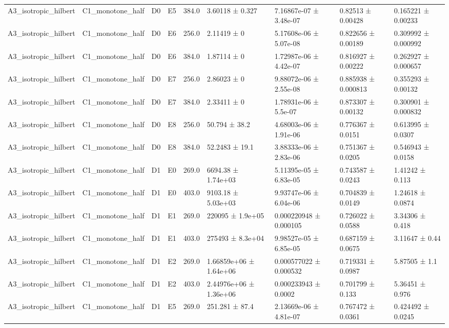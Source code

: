 \begin{table}
\begin{tabular}{lllllllll}
A3\_isotropic\_hilbert & C1\_monotone\_half & D0 & E5 & 384.0 & 3.60118 ± 0.327 & 7.16867e-07 ± 3.48e-07 & 0.82513 ± 0.00428 & 0.165221 ± 0.00233 \\
A3\_isotropic\_hilbert & C1\_monotone\_half & D0 & E6 & 256.0 & 2.11419 ± 0 & 5.17608e-06 ± 5.07e-08 & 0.822656 ± 0.00189 & 0.309992 ± 0.000992 \\
A3\_isotropic\_hilbert & C1\_monotone\_half & D0 & E6 & 384.0 & 1.87114 ± 0 & 1.72987e-06 ± 4.42e-07 & 0.816927 ± 0.00222 & 0.262927 ± 0.000657 \\
A3\_isotropic\_hilbert & C1\_monotone\_half & D0 & E7 & 256.0 & 2.86023 ± 0 & 9.88072e-06 ± 2.55e-08 & 0.885938 ± 0.000813 & 0.355293 ± 0.00132 \\
A3\_isotropic\_hilbert & C1\_monotone\_half & D0 & E7 & 384.0 & 2.33411 ± 0 & 1.78931e-06 ± 5.5e-07 & 0.873307 ± 0.00132 & 0.300901 ± 0.000832 \\
A3\_isotropic\_hilbert & C1\_monotone\_half & D0 & E8 & 256.0 & 50.794 ± 38.2 & 4.68003e-06 ± 1.91e-06 & 0.776367 ± 0.0151 & 0.613995 ± 0.0307 \\
A3\_isotropic\_hilbert & C1\_monotone\_half & D0 & E8 & 384.0 & 52.2483 ± 19.1 & 3.88333e-06 ± 2.83e-06 & 0.751367 ± 0.0205 & 0.546943 ± 0.0158 \\
A3\_isotropic\_hilbert & C1\_monotone\_half & D1 & E0 & 269.0 & 6694.38 ± 1.74e+03 & 5.11395e-05 ± 6.83e-05 & 0.743587 ± 0.0243 & 1.41242 ± 0.113 \\
A3\_isotropic\_hilbert & C1\_monotone\_half & D1 & E0 & 403.0 & 9103.18 ± 5.03e+03 & 9.93747e-06 ± 6.04e-06 & 0.704839 ± 0.0149 & 1.24618 ± 0.0874 \\
A3\_isotropic\_hilbert & C1\_monotone\_half & D1 & E1 & 269.0 & 220095 ± 1.9e+05 & 0.000220948 ± 0.000105 & 0.726022 ± 0.0588 & 3.34306 ± 0.418 \\
A3\_isotropic\_hilbert & C1\_monotone\_half & D1 & E1 & 403.0 & 275493 ± 8.3e+04 & 9.98527e-05 ± 6.85e-05 & 0.687159 ± 0.0675 & 3.11647 ± 0.44 \\
A3\_isotropic\_hilbert & C1\_monotone\_half & D1 & E2 & 269.0 & 1.66859e+06 ± 1.64e+06 & 0.000577022 ± 0.000532 & 0.719331 ± 0.0987 & 5.87505 ± 1.1 \\
A3\_isotropic\_hilbert & C1\_monotone\_half & D1 & E2 & 403.0 & 2.44976e+06 ± 1.36e+06 & 0.000233943 ± 0.0002 & 0.701799 ± 0.133 & 5.36451 ± 0.976 \\
A3\_isotropic\_hilbert & C1\_monotone\_half & D1 & E5 & 269.0 & 251.281 ± 87.4 & 2.13669e-06 ± 4.81e-07 & 0.767472 ± 0.0361 & 0.424492 ± 0.0245 \\

\end{tabular}
\end{table}
